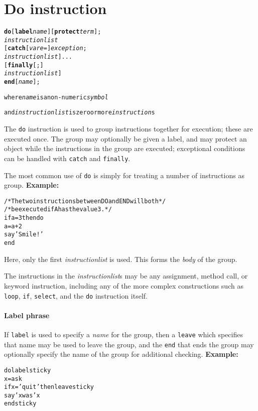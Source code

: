 \chapter{Do instruction}\label{refdo}
\index{,}
\index{,}
\index{,}
\begin{shaded}
\begin{alltt}
\textbf{do} [\textbf{label} \emph{name}] [\textbf{protect} \emph{term}];
        \emph{instructionlist}
    [\textbf{catch} [\emph{vare} =] \emph{exception};
        \emph{instructionlist}]...
    [\textbf{finally}[;]
        \emph{instructionlist}]
    \textbf{end} [\emph{name}];

where \emph{name} is a non-numeric \emph{symbol}

and \emph{instructionlist} is zero or more \emph{instruction}s
\end{alltt}
\end{shaded}
 The \texttt{do} instruction is used to group instructions together for
execution; these are executed once.
The group may optionally be given a label, and may protect an object
while the instructions in the group are executed; exceptional conditions
can be handled with \texttt{catch} and \texttt{finally}.
 
The most common use of \texttt{do} is simply for treating a number of
instructions as group.
 \textbf{Example:}
\begin{alltt}
/* The two instructions between DO and END will both */
/* be executed if A has the value 3.                 */
if a=3 then do
  a=a+2
  say 'Smile!'
  end
\end{alltt}
Here, only the first \emph{instructionlist} is used.
This forms the \emph{body} of the group.
 
The instructions in the \emph{instructionlist}s may be any assignment,
method call, or keyword instruction, including any of the more complex
constructions such as \texttt{loop}, \texttt{if}, \texttt{select}, and
the \texttt{do} instruction itself.
\subsubsection{Label phrase}
 
If \texttt{label} is used to specify a \emph{name} for the group,
then a \texttt{leave} which specifies that name may be used to leave the
group, and the \texttt{end} that ends the group may optionally specify
the name of the group for additional checking.
 \textbf{Example:}
\begin{alltt}
do label sticky
  x=ask
  if x='quit' then leave sticky
  say 'x was' x
  end sticky
\end{alltt}
